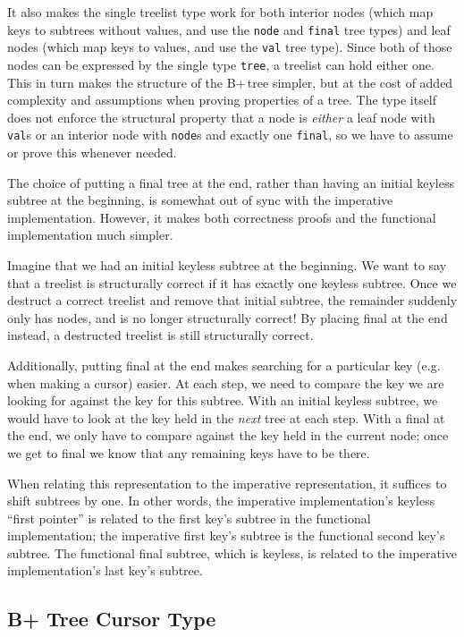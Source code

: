 \documentclass[a4paper,12pt]{article}
\begin{document}
It also makes the single treelist type work for both interior nodes (which map keys to subtrees without values, and use the \texttt{node} and \texttt{final} tree types) and leaf nodes (which map keys to values, and use the \texttt{val} tree type). Since both of those nodes can be expressed by the single type \texttt{tree}, a treelist can hold either one. This in turn makes the structure of the B+\,tree simpler, but at the cost of added complexity and assumptions when proving properties of a tree. The type itself does not enforce the structural property that a node is \textit{either} a leaf node with \texttt{val}s or an interior node with \texttt{node}s and exactly one \texttt{final}, so we have to assume or prove this whenever needed.

The choice of putting a final tree at the end, rather than having an initial keyless subtree at the beginning, is somewhat out of sync with the imperative implementation. However, it makes both correctness proofs and the functional implementation much simpler.

Imagine that we had an initial keyless subtree at the beginning. We want to say that a treelist is structurally correct if it has exactly one keyless subtree. Once we destruct a correct treelist and remove that initial subtree, the remainder suddenly only has nodes, and is no longer structurally correct! By placing final at the end instead, a destructed treelist is still structurally correct.

Additionally, putting final at the end makes searching for a particular key (e.g. when making a cursor) easier. At each step, we need to compare the key we are looking for against the key for this subtree. With an initial keyless subtree, we would have to look at the key held in the \textit{next} tree at each step. With a final at the end, we only have to compare against the key held in the current node; once we get to final we know that any remaining keys have to be there.

When relating this representation to the imperative representation, it suffices to shift subtrees by one. In other words, the imperative implementation’s keyless “first pointer” is related to the first key’s subtree in the functional implementation; the imperative first key’s subtree is the functional second key’s subtree. The functional final subtree, which is keyless, is related to the imperative implementation’s last key’s subtree.

\subsection{B+ Tree Cursor Type}
\end{document}
